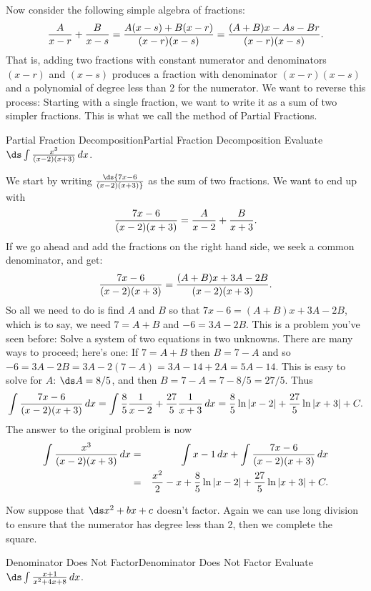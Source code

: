Now consider the following simple algebra of fractions:
$$
  {A\over x-r}+{B\over x-s}={A(x-s)+B(x-r)\over (x-r)(x-s)}=
  {(A+B)x-As-Br\over (x-r)(x-s)}.
$$
That is, adding two fractions with constant numerator and denominators
$(x-r)$ and $(x-s)$ produces a fraction with denominator $(x-r)(x-s)$
and a polynomial of degree less than 2 for the numerator. We want to
reverse this process: Starting with a single fraction, we want to
write it as a sum of two simpler fractions. This is what we call the method of Partial Fractions.


\begin{example}{Partial Fraction Decomposition}{Partial Fraction Decomposition}\label{Partial Fraction Decomposition} 
Evaluate $\ds\int {x^3\over (x-2)(x+3)}\,dx$. 
\end{example}

\begin{solution}
We start by
writing $\ds{7x-6\over (x-2)(x+3)}$ as the sum of two fractions.  We
want to end up with
$${7x-6\over (x-2)(x+3)}={A\over x-2}+{B\over x+3}.$$
If we go ahead and add the fractions on the right hand side, we seek a common denominator, and get:
$${7x-6\over (x-2)(x+3)}={(A+B)x+3A-2B\over (x-2)(x+3)}.$$
So all we need to do is find $A$ and $B$ so that $7x-6=(A+B)x+3A-2B$,
which is to say, we need $7=A+B$ and $-6=3A-2B$. This is a problem
you've seen before: Solve a system of two equations in two
unknowns. There are many ways to proceed; here's one: If $7=A+B$ then
$B=7-A$ and so $-6=3A-2B=3A-2(7-A)=3A-14+2A=5A-14$. This is easy to
solve for $A$: $\ds A= 8/5$, and then $B=7-A=7-8/5=27/5$. Thus
$$
  \int {7x-6\over (x-2)(x+3)}\,dx=
  \int {8\over5}{1\over x-2}+{27\over5}{1\over x+3}\,dx=
  {8\over5}\ln |x-2|+{27\over5}\ln|x+3|+C.
$$
The answer to the original problem is now
\begin{eqnarray*}
  \int {x^3\over (x-2)(x+3)}\,dx
  &=&\int x-1\,dx +\int {7x-6\over (x-2)(x+3)}\,dx\cr
  &=&{x^2\over 2}-x+{8\over5}\ln |x-2|+{27\over5}\ln|x+3|+C.\cr
\end{eqnarray*}
\vskip-10pt
\end{solution}

Now suppose that $\ds x^2+bx+c$ doesn't factor. Again we can use long
division to ensure that the numerator has degree less than 2, then we
complete the square.

\begin{example}{Denominator Does Not Factor}{Denominator Does Not Factor}\label{Denominator Does Not Factor} 
Evaluate $\ds\int {x+1\over x^2+4x+8}\,dx$. 
\end{example}

